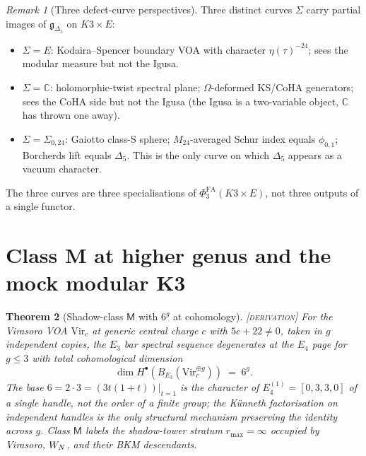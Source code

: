 \documentclass[11pt]{amsart}
\providecommand{\C}{\mathbb{C}}
\providecommand{\gDelta}{\mathfrak{g}_{\Delta_5}}
\providecommand{\Ethree}{E_3}
\providecommand{\PhiFA}{\Phi^{\mathrm{FA}}}
\providecommand{\Mtf}{M_{24}}
\providecommand{\ClaimStatusDerivation}{\textsc{[derivation]}}
\theoremstyle{plain}
\newtheorem{theorem}{Theorem}[section]
\theoremstyle{definition}
\theoremstyle{remark}
\newtheorem{remark}[theorem]{Remark}
\begin{document}
\begin{remark}[Three defect-curve perspectives]
\label{rem:three-curves}
Three distinct curves $\Sigma$ carry partial images of
$\gDelta$ on $K3\times E$:
\begin{itemize}
\item $\Sigma=E$: Kodaira--Spencer boundary VOA with character
$\eta(\tau)^{-24}$; sees the modular measure but not the Igusa.
\item $\Sigma=\C$: holomorphic-twist spectral plane;
$\Omega$-deformed KS/CoHA generators; sees the CoHA side but not the
Igusa (the Igusa is a two-variable object, $\C$ has thrown one away).
\item $\Sigma=\Sigma_{0,24}$: Gaiotto class-S sphere;
$\Mtf$-averaged Schur index equals $\phi_{0,1}$; Borcherds lift
equals $\Delta_5$. This is the only curve on which $\Delta_5$
appears as a vacuum character.
\end{itemize}
The three curves are three specialisations of $\PhiFA_3(K3\times E)$,
not three outputs of a single functor.
\end{remark}

\section{Class M at higher genus and the mock modular K3}

\begin{theorem}[Shadow-class $\mathsf{M}$ with $6^g$ at cohomology]
\label{thm:class-M-6g}
\ClaimStatusDerivation{}\;
For the Virasoro VOA $\mathrm{Vir}_c$ at generic central charge
$c$ with $5c+22\ne 0$, taken in $g$ independent copies, the $\Ethree$
bar spectral sequence degenerates at the $E_4$ page for $g\leq 3$
with total cohomological dimension
\[
\dim H^\bullet(B_{\Ethree}(\mathrm{Vir}_c^{\oplus g}))\;=\;6^g.
\]
The base $6=2\cdot 3=(3t(1+t))|_{t=1}$ is the character of
$E_4^{(1)}=[0,3,3,0]$ of a single handle, not the order of a finite
group; the K\"unneth factorisation on independent handles is the only
structural mechanism preserving the identity across $g$. Class
$\mathsf{M}$ labels the shadow-tower stratum $r_{\max}=\infty$
occupied by Virasoro, $W_N$, and their BKM descendants.
\end{theorem}
\end{document}
